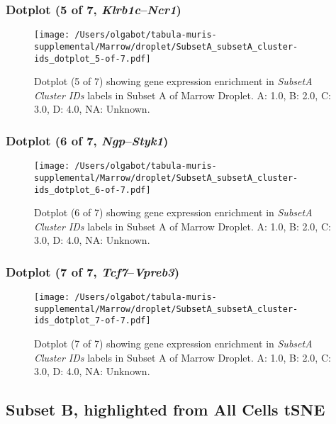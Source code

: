 \clearpage

\subsubsection{Dotplot (5 of 7, \emph{Klrb1c}--\emph{Ncr1})}
\begin{figure}[h]
\centering
\texttt{[image: /Users/olgabot/tabula-muris-supplemental/Marrow/droplet/SubsetA\_subsetA\_cluster-ids\_dotplot\_5-of-7.pdf]}

\caption{ Dotplot (5 of 7)  showing gene expression enrichment in \emph{SubsetA Cluster IDs} labels in Subset A of Marrow Droplet. A: 1.0, B: 2.0, C: 3.0, D: 4.0, NA: Unknown.}
\end{figure}


\clearpage

\subsubsection{Dotplot (6 of 7, \emph{Ngp}--\emph{Styk1})}
\begin{figure}[h]
\centering
\texttt{[image: /Users/olgabot/tabula-muris-supplemental/Marrow/droplet/SubsetA\_subsetA\_cluster-ids\_dotplot\_6-of-7.pdf]}

\caption{ Dotplot (6 of 7)  showing gene expression enrichment in \emph{SubsetA Cluster IDs} labels in Subset A of Marrow Droplet. A: 1.0, B: 2.0, C: 3.0, D: 4.0, NA: Unknown.}
\end{figure}


\clearpage

\subsubsection{Dotplot (7 of 7, \emph{Tcf7}--\emph{Vpreb3})}
\begin{figure}[h]
\centering
\texttt{[image: /Users/olgabot/tabula-muris-supplemental/Marrow/droplet/SubsetA\_subsetA\_cluster-ids\_dotplot\_7-of-7.pdf]}

\caption{ Dotplot (7 of 7)  showing gene expression enrichment in \emph{SubsetA Cluster IDs} labels in Subset A of Marrow Droplet. A: 1.0, B: 2.0, C: 3.0, D: 4.0, NA: Unknown.}
\end{figure}


\clearpage

\subsection{Subset B, highlighted from All Cells tSNE}


